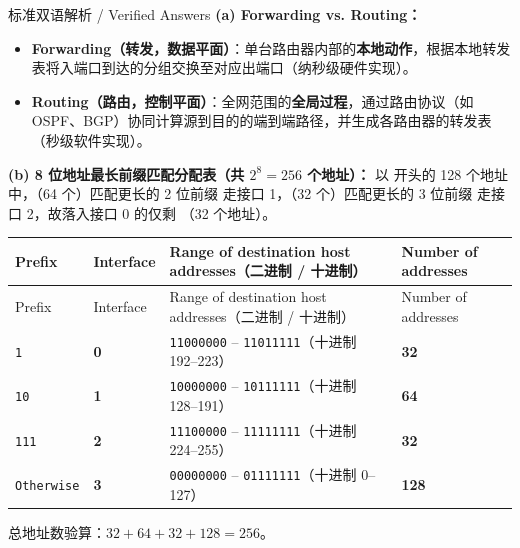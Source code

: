 \begin{StudySolution}{标准双语解析 / Verified Answers}
\textbf{(a) Forwarding vs. Routing：}
\begin{itemize}
\item \textbf{Forwarding（转发，数据平面）}：单台路由器内部的\textbf{本地动作}，根据本地转发表将入端口到达的分组交换至对应出端口（纳秒级硬件实现）。
\item \textbf{Routing（路由，控制平面）}：全网范围的\textbf{全局过程}，通过路由协议（如 OSPF、BGP）协同计算源到目的的端到端路径，并生成各路由器的转发表（秒级软件实现）。
\end{itemize}

\textbf{(b) 8 位地址最长前缀匹配分配表（共 $2^8 = 256$ 个地址）：}
以  开头的 128 个地址中，（64 个）匹配更长的 2 位前缀  走接口 1，（32 个）匹配更长的 3 位前缀  走接口 2，故落入接口 0 的仅剩 \textbf{}（32 个地址）。

\begingroup\small\setlength{\tabcolsep}{3pt}\renewcommand{\arraystretch}{1.20}
\begin{longtable}{@{}>{\raggedright\arraybackslash}p{}>{\raggedright\arraybackslash}p{}>{\raggedright\arraybackslash}p{}>{\raggedright\arraybackslash}p{}@{}}
\toprule
Prefix & Interface & Range of destination host addresses（二进制 / 十进制） & Number of addresses \\
\midrule\endfirsthead
Prefix & Interface & Range of destination host addresses（二进制 / 十进制） & Number of addresses \\
\midrule\endhead
\bottomrule\endfoot
\texttt{1} & \textbf{0} & \texttt{11000000} -- \texttt{11011111}（十进制 192--223） & \textbf{32} \\
\texttt{10} & \textbf{1} & \texttt{10000000} -- \texttt{10111111}（十进制 128--191） & \textbf{64} \\
\texttt{111} & \textbf{2} & \texttt{11100000} -- \texttt{11111111}（十进制 224--255） & \textbf{32} \\
\texttt{Otherwise} & \textbf{3} & \texttt{00000000} -- \texttt{01111111}（十进制 0--127） & \textbf{128} \\
\end{longtable}\endgroup
总地址数验算：$32 + 64 + 32 + 128 = 256$。
\end{StudySolution}


